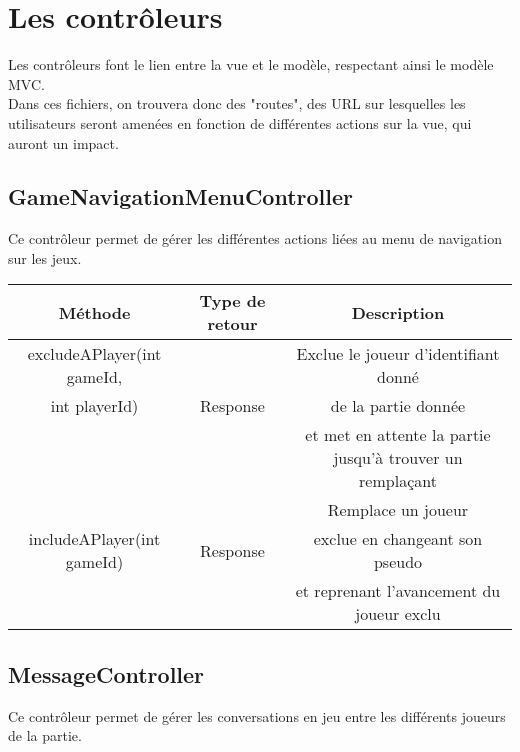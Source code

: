 \documentclass{article}
\begin{document}
    \newpage
    \section{Les contrôleurs}
        Les contrôleurs font le lien entre la vue et le modèle, respectant ainsi le modèle MVC.\\
        \indent Dans ces fichiers, on trouvera donc des "routes", des URL sur lesquelles les utilisateurs seront amenées en fonction de différentes actions sur la vue, qui auront un impact.

        \subsection{GameNavigationMenuController}
            Ce contrôleur permet de gérer les différentes actions liées au menu de navigation sur les jeux.
            
             \begin{center}
                \begin{tabular}{|| c | c | c ||}
                \hline 
                    Méthode & Type de retour & Description \\
                    \hline
                    \hline
                    excludeAPlayer(int gameId, & & Exclue le joueur d'identifiant donné \\
                    int playerId) & Response & de la partie donnée \\
                    & & et met en attente la partie jusqu'à trouver un remplaçant\\
                    \hline
                    & & Remplace un joueur \\
                    includeAPlayer(int gameId)  & Response & exclue en changeant son pseudo \\
                    & & et reprenant l'avancement du joueur exclu \\
                    \hline
                \end{tabular}
            \end{center}

        \subsection{MessageController}
            Ce contrôleur permet de gérer les conversations en jeu entre les différents joueurs de la partie.
            
\end{document}
